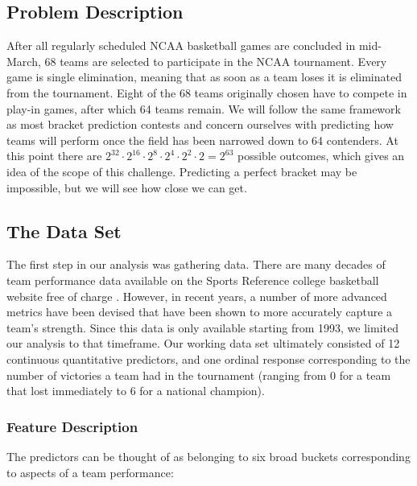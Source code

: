 \documentclass[10pt,a4paper, hidelinks]{article} %
\begin{document}
\subsection{Problem Description}
After all regularly scheduled NCAA basketball games are concluded in mid-March, 68 teams are selected to participate in the NCAA tournament. Every game is single elimination, meaning that as soon as a team loses it is eliminated from the tournament. Eight of the 68 teams originally chosen have to compete in play-in games, after which 64 teams remain. We will follow the same framework as most bracket prediction contests and concern ourselves with predicting how teams will perform once the field has been narrowed down to 64 contenders. At this point there are $2^{32} \cdot 2^{16} \cdot 2^8 \cdot 2^4 \cdot 2^2 \cdot 2 = 2^{63}$ possible outcomes, which gives an idea of the scope of this challenge. Predicting a perfect bracket may be impossible, but we will see how close we can get.

\subsection{The Data Set}

The first step in our analysis was gathering data. There are many decades of team performance data available on the Sports Reference college basketball website free of charge \cite{bballsite}. However, in recent years, a number of more advanced metrics have been devised that have been shown to more accurately capture a team's strength. Since this data is only available starting from 1993, we limited our analysis to that timeframe. Our working data set ultimately consisted of 12 continuous quantitative predictors, and one ordinal response corresponding to the number of victories a team had in the tournament (ranging from 0 for a team that lost immediately to 6 for a national champion).

\subsubsection{Feature Description}

The predictors can be thought of as belonging to six broad buckets corresponding to aspects of a team performance:
\end{document}
